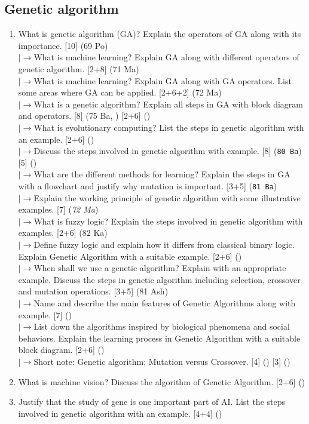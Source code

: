 \documentclass[12pt]{article}
\newcommand{\lb}{\\$\left|\rightarrow\right.$}
\begin{document}
  \subsection{Genetic algorithm}
    \begin{enumerate}[topsep=0pt, noitemsep]
      \item What is genetic algorithm (GA)? Explain the operators of GA along with its importance. \hfill [10] (69 Po)
        \lb What is machine learning? Explain GA along with different operators of genetic algorithm. \hfill [2+8] (71 Ma)
        \lb What is machine learning? Explain GA along with GA operators. List some areas where GA can be applied. \hfill [2+6+2] (72 Ma)
        \lb What is a genetic algorithm? Explain all steps in GA with block diagram and operators. \hfill [8] (75 Ba, ) [2+6] ()
        \lb What is evolutionary computing? List the steps in genetic algorithm with an example. \hfill [2+6] ()
        \lb Discuss the steps involved in genetic algorithm with example. \hfill [8] (\texttt{80 Ba}) [5] ()
        \lb What are the different methods for learning? Explain the steps in GA with a flowchart and justify why mutation is important. \hfill [3+5] (\texttt{81 Ba})
        \lb Explain the working principle of genetic algorithm with some illustrative examples. \hfill [7] (\textit{72 Ma})
        \lb What is fuzzy logic? Explain the steps involved in genetic algorithm with examples. \hfill [2+6] (82 Ka)
        \lb Define fuzzy logic and explain how it differs from classical binary logic. Explain Genetic Algorithm with a suitable example. \hfill [2+6] ()
        \lb When shall we use a genetic algorithm? Explain with an appropriate example. Discuss the steps in genetic algorithm including selection, crossover and mutation operations. \hfill [3+5] (81 Ash)
        \lb Name and describe the main features of Genetic Algorithms along with example. \hfill [7] ()
        \lb List down the algorithms inspired by biological phenomena and social behaviors. Explain the learning process in Genetic Algorithm with a suitable block diagram. \hfill [2+6] ()
        \lb Short note: Genetic algorithm; Mutation versus Crossover. \hfill [4] () [3] ()

      \item What is machine vision? Discuss the algorithm of Genetic Algorithm. \hfill [2+6] ()

      \item Justify that the study of gene is one important part of AI. List the steps involved in genetic algorithm with an example. \hfill [4+4] ()


\end{enumerate}
\end{document}
